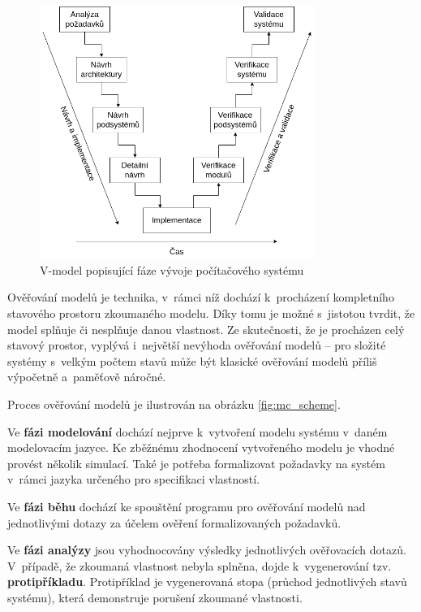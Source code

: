\begin{figure}[H]
    \centering
    \includegraphics[width=0.8\textwidth]{obrazky-figures/vmodel.png}
    \caption{V-model popisující fáze vývoje počítačového systému}
    \label{fig:vmodel}
\end{figure}

Ověřování modelů je technika, v~rámci níž dochází k~procházení kompletního stavového prostoru zkoumaného modelu. Díky tomu je možné s~jistotou tvrdit, že model splňuje či nesplňuje danou vlastnost. Ze skutečnosti, že je procházen celý stavový prostor, vyplývá i~největší nevýhoda ověřování modelů -- pro složité systémy s~velkým počtem stavů může být klasické ověřování modelů příliš výpočetně a~paměťově náročné.

Proces ověřování modelů je ilustrován na obrázku \ref{fig:mc_scheme}.

Ve \textbf{fázi modelování} dochází nejprve k~vytvoření modelu systému v~daném modelovacím jazyce. Ke zběžnému zhodnocení vytvořeného modelu je vhodné provést několik simulací. Také je potřeba formalizovat požadavky na systém v~rámci jazyka určeného pro specifikaci vlastností.

Ve \textbf{fázi běhu} dochází ke spouštění programu pro ověřování modelů nad jednotlivými dotazy za účelem ověření formalizovaných požadavků.

Ve \textbf{fázi analýzy} jsou vyhodnocovány výsledky jednotlivých ověřovacích dotazů. V~případě, že zkoumaná vlastnost nebyla splněna, dojde k~vygenerování tzv. \textbf{protipříkladu}. Protipříklad je vygenerovaná stopa (průchod jednotlivých stavů systému), která demonstruje porušení zkoumané vlastnosti.

